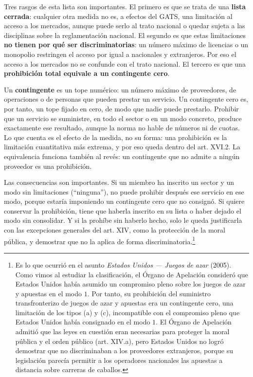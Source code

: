 \documentclass[10pt,a4paper]{article}
\begin{document}
Tres rasgos de esta lista son importantes. El primero es que se trata de una \textbf{lista cerrada}: cualquier otra medida no es, a efectos del GATS, una limitación al acceso a los mercados, aunque puede serlo al trato nacional o quedar sujeta a las disciplinas sobre la reglamentación nacional. El segundo es que estas limitaciones \textbf{no tienen por qué ser discriminatorias}: un número máximo de licencias o un monopolio restringen el acceso por igual a nacionales y extranjeros. Por eso el acceso a los mercados no se confunde con el trato nacional. El tercero es que una \textbf{prohibición total equivale a un contingente cero}.

Un \textbf{contingente} es un tope numérico: un número máximo de proveedores, de operaciones o de personas que pueden prestar un servicio. Un contingente cero es, por tanto, un tope fijado en cero, de modo que nadie puede prestarlo. Prohibir que un servicio se suministre, en todo el sector o en un modo concreto, produce exactamente ese resultado, aunque la norma no hable de números ni de cuotas. Lo que cuenta es el efecto de la medida, no su forma: una prohibición es la limitación cuantitativa más extrema, y por eso queda dentro del art. XVI.2. La equivalencia funciona también al revés: un contingente que no admite a ningún proveedor es una prohibición.

Las consecuencias son importantes. Si un miembro ha inscrito un sector y un modo sin limitaciones (``ninguna''), no puede prohibir después ese servicio en ese modo, porque estaría imponiendo un contingente cero que no consignó. Si quiere conservar la prohibición, tiene que haberla inscrito en su lista o haber dejado el modo sin consolidar. Y si la prohíbe sin haberlo hecho, solo le queda justificarla con las excepciones generales del art. XIV, como la protección de la moral pública, y demostrar que no la aplica de forma discriminatoria.\footnote{%
  Es lo que ocurrió en el asunto \textit{Estados Unidos --- Juegos de azar} (2005). Como vimos al estudiar la clasificación, el Órgano de Apelación consideró que Estados Unidos había asumido un compromiso pleno sobre los juegos de azar y apuestas en el modo $1$. Por tanto, su prohibición del suministro transfronterizo de juegos de azar y apuestas era un contingente cero, una limitación de los tipos (a) y (c), incompatible con el compromiso pleno que Estados Unidos había consignado en el modo $1$. El Órgano de Apelación admitió que las leyes en cuestión eran necesarias para proteger la moral pública y el orden público (art. XIV.a), pero Estados Unidos no logró demostrar que no discriminaban a los proveedores extranjeros, porque su legislación parecía permitir a los operadores nacionales las apuestas a distancia sobre carreras de caballos.
}
\end{document}
